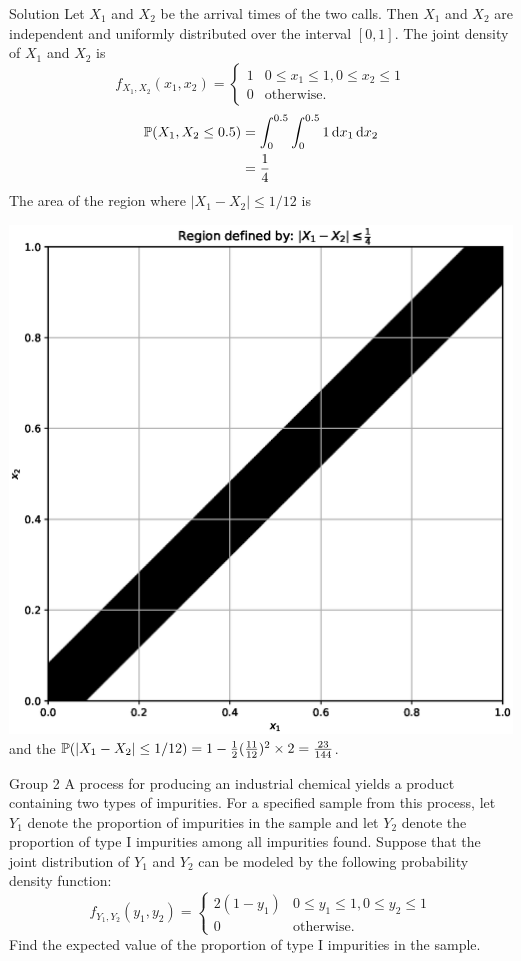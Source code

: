 \documentclass{article}
\begin{document}
\begin{solution}
    {Solution}
    Let $X_1$ and $X_2$ be the arrival times of the two calls. Then $X_1$ and $X_2$ are independent and uniformly distributed over the interval $[0,1]$. The joint density of $X_1$ and $X_2$ is
    \[
        f_{X_1,X_2}(x_1,x_2) = {
            \begin{cases}
                1 & 0\leq x_1\leq 1, 0\leq x_2\leq 1 \\
                0 & \text{otherwise.}
            \end{cases}
        }
    \]
    \begin{align*}
        \P{X_1,X_2\leq 0.5}
        &= \int_{0}^{0.5}\int_{0}^{0.5}1\diff x_1\diff x_2 \\
        &= \frac{1}{4}
    \end{align*}
    The area of the region where $|X_1-X_2|\leq 1/12$ is

    \includegraphics[width=\textwidth, center]{plot4.eps}
    and the $\P{|X_1-X_2|\leq 1/12}=1-\frac{1}{2}(\frac{11}{12})^2\times2=\frac{23}{144}$.
\end{solution}

\begin{problem}
    {Group 2}
    A process for producing an industrial chemical yields a product containing two types of impurities. For a specified sample from this process, let $Y_1$ denote the proportion of impurities in the sample and let $Y_2$ denote the proportion of type I impurities among all impurities found. Suppose that the joint distribution of $Y_1$ and $Y_2$ can be modeled by the following probability density function:
    \[
    f_{Y_1,Y_2}(y_1,y_2)={
        \begin{cases}
            2(1-y_1) & 0\leq y_1\leq1, 0\leq y_2\leq 1\\
            0 & \text{otherwise.}
        \end{cases}
    }
    \]
    Find the expected value of the proportion of type I impurities in the sample.
\end{problem}
\end{document}
